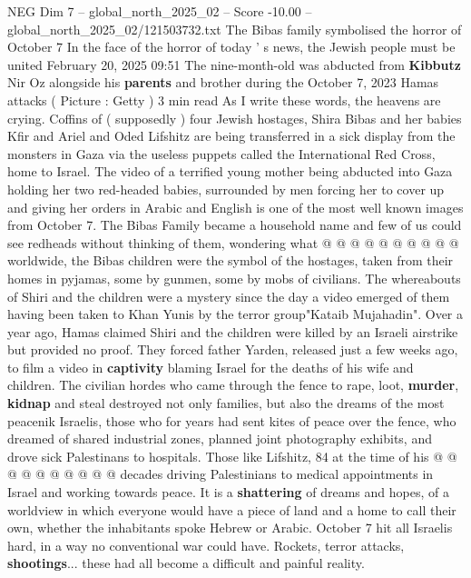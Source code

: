 \begin{textsample}{NEG Dim 7 – global\_north\_2025\_02 – Score -10.00 – global\_north\_2025\_02/121503732.txt}  \label{ex:f7_neg_064}
The Bibas family symbolised the horror of October 7 In the face of the horror of today ' s news, the Jewish people must be united February 20, 2025 09:51 The nine-month-old was abducted from \textbf{Kibbutz} Nir Oz alongside his \textbf{parents} and brother during the October 7, 2023 Hamas attacks ( Picture : Getty ) 3 min read As I write these words, the heavens are crying.
Coffins of ( supposedly ) four Jewish hostages, Shira Bibas and her babies Kfir and Ariel and Oded Lifshitz are being transferred in a sick display from the monsters in Gaza via the useless puppets called the International Red Cross, home to Israel.
The video of a terrified young mother being abducted into Gaza holding her two red-headed babies, surrounded by men forcing her to cover up and giving her orders in Arabic and English is one of the most well known images from October 7.
The Bibas Family became a household name and few of us could see redheads without thinking of them, wondering what @ @ @ @ @ @ @ @ @ @ worldwide, the Bibas children were the symbol of the hostages, taken from their homes in pyjamas, some by gunmen, some by mobs of civilians.
The whereabouts of Shiri and the children were a mystery since the day a video emerged of them having been taken to Khan Yunis by the terror group"Kataib Mujahadin".
Over a year ago, Hamas claimed Shiri and the children were killed by an Israeli airstrike but provided no proof.
They forced father Yarden, released just a few weeks ago, to film a video in \textbf{captivity} blaming Israel for the deaths of his wife and children.
The civilian hordes who came through the fence to rape, loot, \textbf{murder}, \textbf{kidnap} and steal destroyed not only families, but also the dreams of the most peacenik Israelis, those who for years had sent kites of peace over the fence, who dreamed of shared industrial zones, planned joint photography exhibits, and drove sick Palestinans to hospitals.
Those like Lifshitz, 84 at the time of his @ @ @ @ @ @ @ @ @ @ decades driving Palestinians to medical appointments in Israel and working towards peace.
It is a \textbf{shattering} of dreams and hopes, of a worldview in which everyone would have a piece of land and a home to call their own, whether the inhabitants spoke Hebrew or Arabic.
October 7 hit all Israelis hard, in a way no conventional war could have.
Rockets, terror attacks, \textbf{shootings}... these had all become a difficult and painful reality.

\end{textsample}
